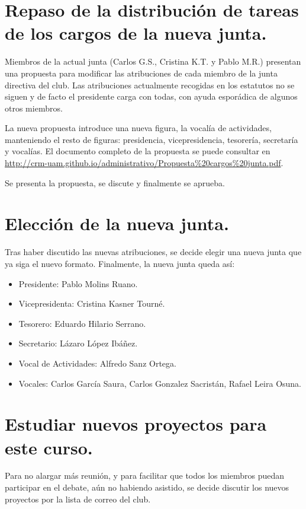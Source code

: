 \documentclass[a4paper]{article}
\begin{document}
\section{Repaso de la distribución de tareas de los cargos de la nueva junta.}

Miembros de la actual junta (Carlos G.S., Cristina K.T. y Pablo M.R.) presentan una propuesta para modificar las atribuciones de cada miembro de la junta directiva del club. Las atribuciones actualmente recogidas en los estatutos no se siguen y de facto el presidente carga con todas, con ayuda esporádica de algunos otros miembros. 

La nueva propuesta introduce una nueva figura, la vocalía de actividades, manteniendo el resto de figuras: presidencia, vicepresidencia, tesorería, secretaría y vocalías. El documento completo de la propuesta se puede consultar en \url{http://crm-uam.github.io/administrativo/Propuesta\%20cargos\%20junta.pdf}.

Se presenta la propuesta, se discute y finalmente se aprueba.

\section{Elección de la nueva junta.}

Tras haber discutido las nuevas atribuciones, se decide elegir una nueva junta que ya siga el nuevo formato. Finalmente, la nueva junta queda así:

\begin{itemize}
\item Presidente: Pablo Molins Ruano.
\item Vicepresidenta: Cristina Kasner Tourné.
\item Tesorero: Eduardo Hilario Serrano.
\item Secretario: Lázaro López Ibáñez.
\item Vocal de Actividades: Alfredo Sanz Ortega.
\item Vocales: Carlos García Saura, Carlos Gonzalez Sacristán, Rafael Leira Osuna.
\end{itemize}

\section{Estudiar nuevos proyectos para este curso.}

Para no alargar más reunión, y para facilitar que todos los miembros puedan participar en el debate, aún no habiendo asistido, se decide discutir los nuevos proyectos por la lista de correo del club.
\end{document}
